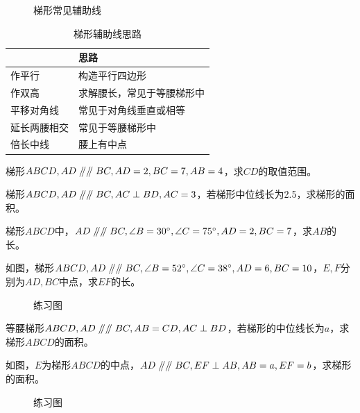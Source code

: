 \begin{figure}[H]
    \centering
    \resizebox{8cm}{!}{}
    \caption{梯形常见辅助线}
\end{figure}
\begin{table}[H]
    \centering
    \caption{梯形辅助线思路}
    \begin{tabular}{|l|l|}
        \hline
               & 思路            \\
        \hline
        作平行    & 构造平行四边形       \\
        \hline
        作双高    & 求解腰长，常见于等腰梯形中 \\
        \hline
        平移对角线  & 常见于对角线垂直或相等   \\
        \hline
        延长两腰相交 & 常见于等腰梯形中      \\
        \hline
        倍长中线   & 腰上有中点         \\
        \hline
    \end{tabular}
\end{table}
\begin{problem}
梯形$ABCD,AD\mathrel{/\mkern-5mu/} \mathrel{/\mkern-5mu/} BC,AD=2,BC=7,AB=4$，求$CD$的取值范围。
\end{problem}
\begin{problem}
梯形$ABCD,AD\mathrel{/\mkern-5mu/} \mathrel{/\mkern-5mu/} BC,AC\perp BD,AC=3$，若梯形中位线长为2.5，求梯形的面积。
\end{problem}
\begin{problem}
梯形$ABCD$中，$AD\mathrel{/\mkern-5mu/} \mathrel{/\mkern-5mu/} BC,\angle B=30^\circ,\angle C=75^\circ,AD=2,BC=7$，求$AB$的长。
\end{problem}
\begin{problem}
如图，梯形$ABCD,AD\mathrel{/\mkern-5mu/} \mathrel{/\mkern-5mu/} BC,\angle B=52^\circ,\angle C=38^\circ,AD=6,BC=10$，$E,F$分别为$AD,BC$中点，求$EF$的长。
\end{problem}
\begin{figure}[H]
    \centering
    \resizebox{4cm}{!}{}
    \caption{练习图}
\end{figure}
\begin{problem}
等腰梯形$ABCD,AD\mathrel{/\mkern-5mu/} \mathrel{/\mkern-5mu/} BC,AB=CD,AC\perp BD$，若梯形的中位线长为$a$，求梯形$ABCD$的面积。
\end{problem}
\begin{problem}
如图，$E$为梯形$ABCD$的中点，$AD\mathrel{/\mkern-5mu/} \mathrel{/\mkern-5mu/} BC,EF\perp AB,AB=a,EF=b$，求梯形的面积。
\end{problem}
\begin{figure}[H]
    \centering
    \resizebox{4cm}{!}{}
    \caption{练习图}
\end{figure}
